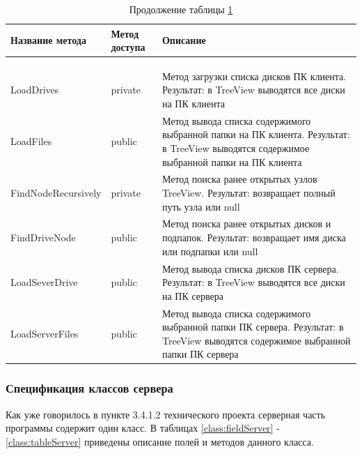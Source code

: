 \vspace{-\tablebelowskip}

\begin{longtable}[l]{|p{4.25cm}|p{2.35cm}|p{8.1cm}|}
	\caption{Описание методов класса FileView\label{class:tableView}}\\
	\hline \centrow Название метода & \centrow Метод
	доступа & \centrow Описание \\
	\hline \centrow 1 & \centrow 2 & \centrow 3\\
	\endfirsthead
	\caption*{Продолжение таблицы \ref{class:tableView}}\\
	\hline \centrow 1 & \centrow 2 & \centrow\\
	\finishhead
	\hline LoadDrives & private & Метод загрузки списка дисков ПК клиента.
	Результат: в TreeView выводятся все диски на ПК клиента\\
	\hline LoadFiles & public & Метод вывода списка содержимого выбранной папки на ПК клиента.
	Результат: в TreeView выводятся содержимое выбранной папки на ПК клиента\\
	\hline FindNodeRecursively & private & Метод поиска ранее открытых узлов TreeView.
	Результат: возвращает полный путь узла или null\\
	\hline FindDriveNode & public & Метод поиска ранее открытых дисков и подпапок.
	Результат: возвращает имя диска или подпапки или null\\
	\hline LoadSeverDrive & public & Метод вывода списка дисков ПК сервера.
	Результат: в TreeView выводятся все диски на ПК сервера\\
	\hline LoadServerFiles & public & Метод вывода списка содержимого выбранной папки ПК сервера.
	Результат: в TreeView выводятся содержимое выбранной папки ПК сервера\\
\end{longtable}
\vspace{-\tablebelowskip}

\subsubsection{Спецификация классов сервера}
Как уже говорилось в пункте 3.4.1.2 технического проекта серверная часть программы содержит один класс. В таблицах \ref{class:fieldServer} - \ref{class:tableServer} приведены описание полей и методов данного класса. 

